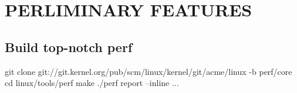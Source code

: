 \chapter{PERLIMINARY FEATURES}
\section{Build top-notch perf}
\starttyping
git clone git://git.kernel.org/pub/scm/linux/kernel/git/acme/linux -b perf/core
cd linux/tools/perf
make
./perf report --inline ...
\stoptyping
